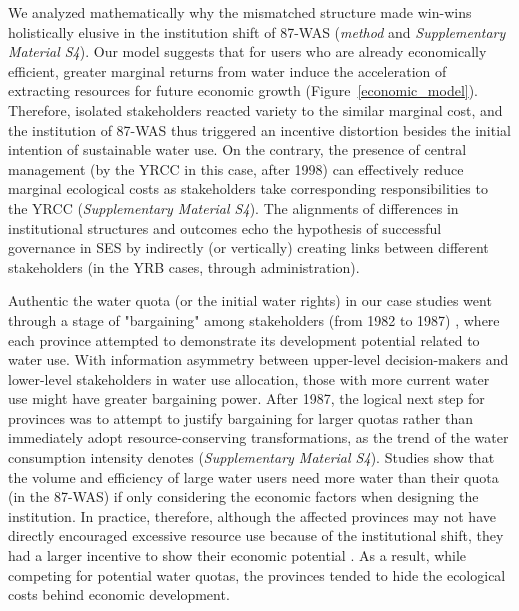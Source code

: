 We analyzed mathematically why the mismatched structure made win-wins holistically elusive in the institution shift of 87-WAS (\textit{method} and \textit{Supplementary Material S4}).
Our model suggests that for users who are already economically efficient, greater marginal returns from water induce the acceleration of extracting resources for future economic growth (Figure~\ref{economic_model}).
Therefore, isolated stakeholders reacted variety to the similar marginal cost, and the institution of 87-WAS thus triggered an incentive distortion besides the initial intention of sustainable water use.
On the contrary, the presence of central management (by the YRCC in this case, after 1998) can effectively reduce marginal ecological costs as stakeholders take corresponding responsibilities to the YRCC (\textit{Supplementary Material S4}).
The alignments of differences in institutional structures and outcomes echo the hypothesis of successful governance in SES by indirectly (or vertically) creating links between different stakeholders (in the YRB cases, through administration).

Authentic the water quota (or the initial water rights) in our case studies went through a stage of "bargaining" among stakeholders (from 1982 to 1987) \cite{wang2019a, wang2019d}, where each province attempted to demonstrate its development potential related to water use.
With information asymmetry between upper-level decision-makers and lower-level stakeholders in water use allocation, those with more current water use might have greater bargaining power.
After 1987, the logical next step for provinces was to attempt to justify bargaining for larger quotas rather than immediately adopt resource-conserving transformations, as the trend of the water consumption intensity denotes (\textit{Supplementary Material S4}).
Studies show that the volume and efficiency of large water users need more water than their quota (in the 87-WAS) if only considering the economic factors when designing the institution.
In practice, therefore, although the affected provinces may not have directly encouraged excessive resource use because of the institutional shift, they had a larger incentive to show their economic potential
\cite{krieger1955, ostrom1990}.
As a result, while competing for potential water quotas, the provinces tended to hide the ecological costs behind economic development.


